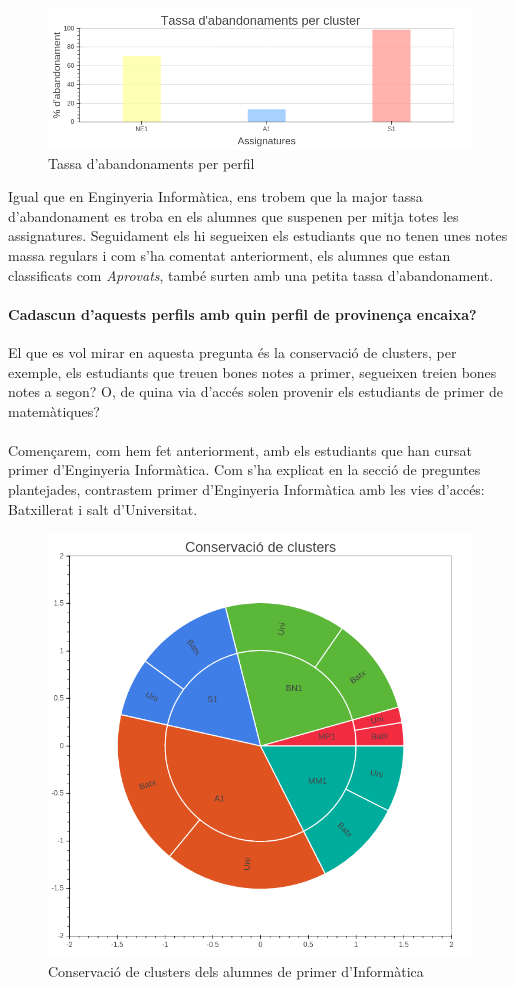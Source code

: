 \documentclass[12pt,a4paper,catalan]{article}
\begin{document}
\begin{figure}[h]
\centering
\includegraphics[width=\linewidth]{img/abandonaments_primer_mates.png}
\caption{Tassa d'abandonaments per perfil}
\end{figure}

Igual que en Enginyeria Informàtica, ens trobem que la major tassa d'abandonament es troba en els alumnes que suspenen per mitja totes les assignatures. Seguidament els hi segueixen els estudiants que no tenen unes notes massa regulars i com s'ha comentat anteriorment, els alumnes que estan classificats com \textit{Aprovats}, també surten amb una petita tassa d'abandonament.

\newpage

\paragraph{Cadascun d'aquests perfils amb quin perfil de provinença encaixa?}
El que es vol mirar en aquesta pregunta és la conservació de clusters, per exemple, els estudiants que treuen bones notes a primer, segueixen treien bones notes a segon? O, de quina via d'accés solen provenir els estudiants de primer de matemàtiques? 
\\
\\
Començarem, com hem fet anteriorment, amb els estudiants que han cursat primer d'Enginyeria Informàtica. Com s'ha explicat en la secció de preguntes plantejades, contrastem primer d'Enginyeria Informàtica amb les vies d'accés: Batxillerat i salt d'Universitat.

\begin{figure}[h]
\centering
\includegraphics[width=.6\linewidth]{img/conservacio_clusters_primer_info.png}
\caption{Conservació de clusters dels alumnes de primer d'Informàtica}
\end{figure}
\end{document}
